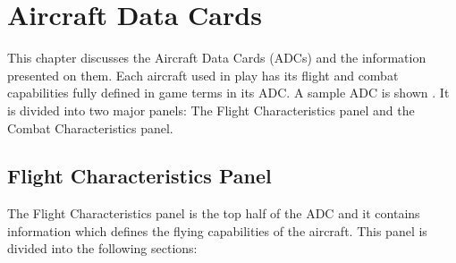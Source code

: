 \section{Aircraft Data Cards}

This chapter discusses the Aircraft Data Cards (ADCs) and the information presented on them. Each aircraft used in play has its flight and combat capabilities fully defined in game terms in its ADC. A sample ADC is shown .  It is divided into two major panels: The Flight Characteristics panel and the Combat Characteristics panel.

\subsection{Flight Characteristics Panel}


    
The Flight Characteristics panel is the top half of the ADC and it contains information which defines the flying capabilities of the aircraft. This panel is divided into the following sections:

